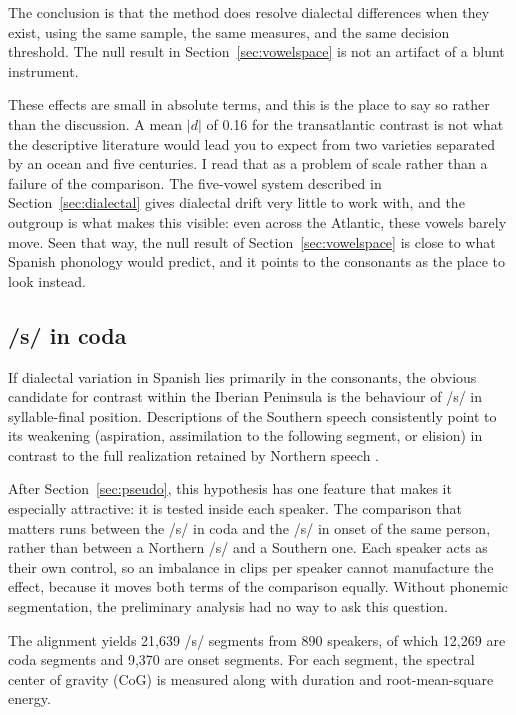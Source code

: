 \documentclass[11pt]{article}
\begin{document}
The conclusion is that the method does resolve dialectal differences when they
exist, using the same sample, the same measures, and the same decision threshold.
The null result in Section~\ref{sec:vowelspace} is not an artifact of a blunt
instrument.

These effects are small in absolute terms, and this is the place to say so rather
than the discussion. A mean $|d|$ of 0.16 for the transatlantic contrast is not
what the descriptive literature would lead you to expect from two varieties
separated by an ocean and five centuries. I read that as a problem of scale
rather than a failure of the comparison. The five-vowel system described in
Section~\ref{sec:dialectal} gives dialectal drift very little to work with, and
the outgroup is what makes this visible: even across the Atlantic, these vowels
barely move. Seen that way, the null result of Section~\ref{sec:vowelspace} is
close to what Spanish phonology would predict, and it points to the consonants as
the place to look instead.

\subsection{/s/ in coda}
\label{sec:coda}

If dialectal variation in Spanish lies primarily in the consonants, the obvious
candidate for contrast within the Iberian Peninsula is the behaviour of /s/ in
syllable-final position. Descriptions of the Southern speech consistently point
to its weakening (aspiration, assimilation to the following segment, or elision)
in contrast to the full realization retained by Northern speech
\citep{narbona1998,gerfen2002,torreira2007}.

After Section~\ref{sec:pseudo}, this hypothesis has one feature that makes it
especially attractive: it is tested inside each speaker. The comparison that
matters runs between the /s/ in coda and the /s/ in onset of the same person,
rather than between a Northern /s/ and a Southern one. Each speaker acts as their
own control, so an imbalance in clips per speaker cannot manufacture the effect,
because it moves both terms of the comparison equally. Without phonemic
segmentation, the preliminary analysis had no way to ask this question.

The alignment yields 21,639 /s/ segments from 890 speakers, of which 12,269 are
coda segments and 9,370 are onset segments. For each segment, the spectral center
of gravity (CoG) is measured along with duration and root-mean-square energy.
\end{document}
